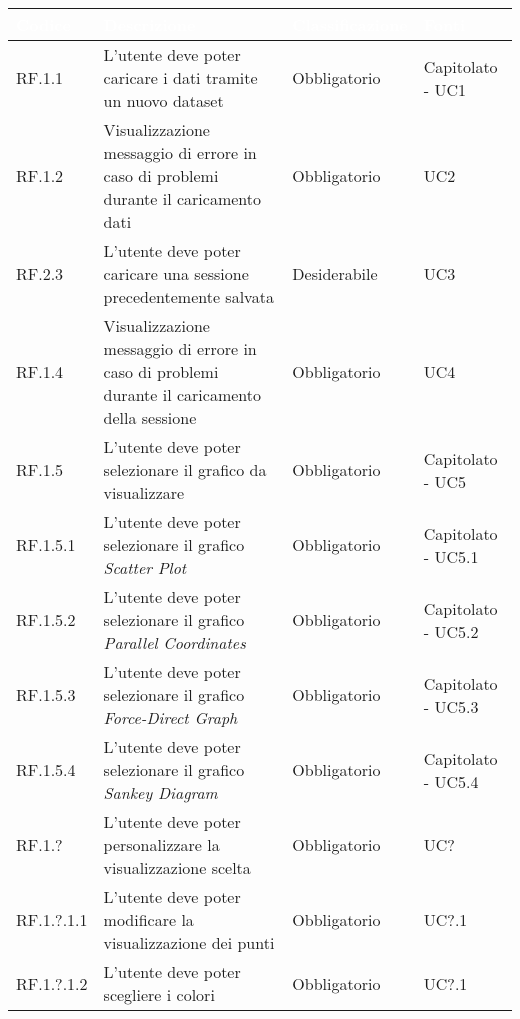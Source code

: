 \begin{center}
  \centering
  \begin{longtable}{|L{2cm}|C{5,5cm}|C{3cm}|C{2cm}|}
    \hline
    \textcolor[HTML]{FFFFFF}{\textbf{Codice}} & \textcolor[HTML]{FFFFFF}{\textbf{Descrizione}} & \textcolor[HTML]{FFFFFF}{\textbf{Classificazione}} & \textcolor[HTML]{FFFFFF}{\textbf{Fonti}}
    \\ \hline
    RF.1.1 & L'utente deve poter caricare i dati tramite un nuovo dataset & Obbligatorio & Capitolato - UC1 \\ \hline
    RF.1.2 & Visualizzazione messaggio di errore in caso di problemi durante il caricamento dati & Obbligatorio & UC2 \\ \hline
    RF.2.3 & L'utente deve poter caricare una sessione precedentemente salvata & Desiderabile & UC3 \\ \hline
    RF.1.4 & Visualizzazione messaggio di errore in caso di problemi durante il caricamento della sessione & Obbligatorio & UC4 \\ \hline
    RF.1.5 & L'utente deve poter selezionare il grafico da visualizzare & Obbligatorio & Capitolato - UC5 \\ \hline
    RF.1.5.1 & L'utente deve poter selezionare il grafico \textit{Scatter Plot} & Obbligatorio & Capitolato - UC5.1 \\ \hline
    RF.1.5.2 & L'utente deve poter selezionare il grafico \textit{Parallel Coordinates} & Obbligatorio & Capitolato - UC5.2 \\ \hline
    RF.1.5.3 & L'utente deve poter selezionare il grafico \textit{Force-Direct Graph} & Obbligatorio & Capitolato - UC5.3 \\ \hline
    RF.1.5.4 & L'utente deve poter selezionare il grafico \textit{Sankey Diagram} & Obbligatorio & Capitolato - UC5.4 \\ \hline
    RF.1.? & L'utente deve poter personalizzare la visualizzazione scelta & Obbligatorio & UC? \\ \hline
    RF.1.?.1.1 & L'utente deve poter modificare la visualizzazione dei punti & Obbligatorio & UC?.1 \\ \hline
    RF.1.?.1.2 & L'utente deve poter scegliere i colori & Obbligatorio & UC?.1 \\ \hline

\end{longtable}
\end{center}

